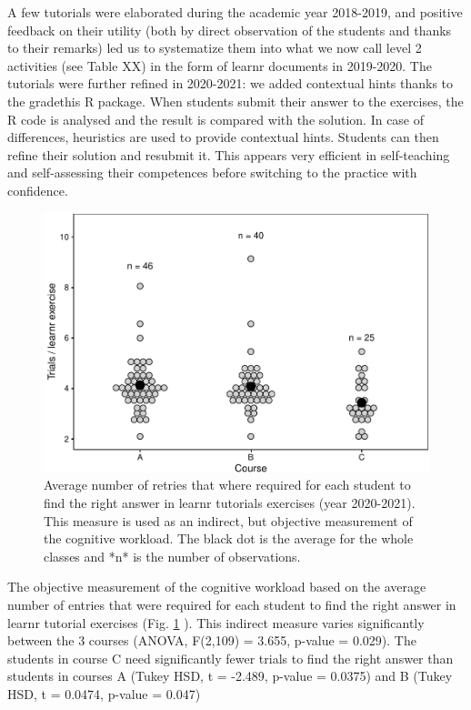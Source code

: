 \documentclass{aims}
\theoremstyle{definition}
\begin{document}
A few tutorials were elaborated during the academic year 2018-2019, and
positive feedback on their utility (both by direct observation of the
students and thanks to their remarks) led us to systematize them into
what we now call level 2 activities (see Table XX) in the form of learnr
documents in 2019-2020. The tutorials were further refined in 2020-2021:
we added contextual hints thanks to the gradethis R package. When
students submit their answer to the exercises, the R code is analysed
and the result is compared with the solution. In case of differences,
heuristics are used to provide contextual hints. Students can then
refine their solution and resubmit it. This appears very efficient in
self-teaching and self-assessing their competences before switching to
the practice with confidence.

\begin{figure}
\includegraphics[width=1\linewidth]{teaching_data_science_files/figure-latex/fig_learn_trials-1} \caption{\label{fig:fig_learn_trials} Average number of retries that where required for each student to find the right answer in learnr tutorials exercises (year 2020-2021). This measure is used as an indirect, but objective measurement of the cognitive workload. The black dot is the average for the whole classes and *n* is the number of observations.}\label{fig:fig_learn_trials}
\end{figure}

The objective measurement of the cognitive workload based on the average
number of entries that were required for each student to find the right
answer in learnr tutorial exercises (Fig. \ref {fig:fig_learn_trials} ).
This indirect measure varies significantly between the 3 courses (ANOVA,
F(2,109) = 3.655, p-value = 0.029). The students in course C need
significantly fewer trials to find the right answer than students in
courses A (Tukey HSD, t = -2.489, p-value = 0.0375) and B (Tukey HSD, t
= 0.0474, p-value = 0.047)
\end{document}
